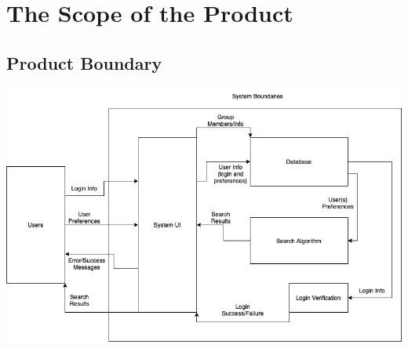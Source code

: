 \documentclass[12pt]{article}
\begin{document}
\section{The Scope of the Product}


\subsection{Product Boundary}
\includegraphics[scale=0.6]{SystemBoundariesDiagram.png}
\end{document}
